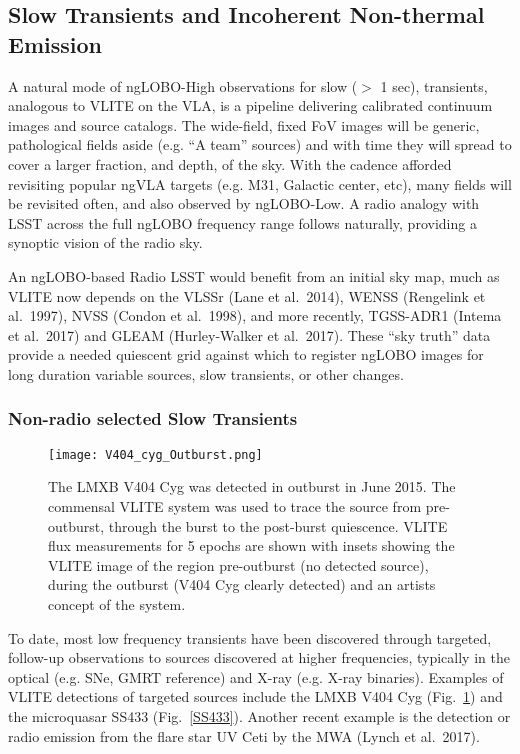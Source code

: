 \documentclass[11pt]{article}
\begin{document}
\subsection{Slow Transients and Incoherent Non-thermal Emission}

A natural mode of ngLOBO-High observations for slow ($>$ 1 sec),  transients, analogous to VLITE on the VLA, is a pipeline delivering calibrated continuum images and source catalogs. The wide-field, fixed FoV images will be generic, pathological fields aside (e.g. “A team” sources) and with time they will spread to cover a larger fraction, and depth, of the sky. With the cadence afforded revisiting popular ngVLA targets (e.g. M31, Galactic center, etc), many fields will be revisited often, and also observed by ngLOBO-Low. A radio analogy with LSST across the full ngLOBO frequency range follows naturally, providing a synoptic vision of the radio sky. 

An ngLOBO-based Radio LSST would benefit from an initial sky map, much as VLITE now depends on the VLSSr (Lane et al.\ 2014), WENSS (Rengelink et al.\ 1997), NVSS (Condon et al.\ 1998), and more recently, TGSS-ADR1 (Intema et al.\ 2017) and GLEAM (Hurley-Walker et al.\ 2017). These ``sky truth'' data provide a needed quiescent grid against which to register ngLOBO images for long duration variable sources, slow transients, or other changes.  

\subsubsection{Non-radio selected Slow Transients}

\begin{figure}[h!]
\begin{center}
\texttt{[image: V404\_cyg\_Outburst.png]}
\end{center}
\vspace{-0.5cm}
  \caption{
The LMXB V404 Cyg was detected in outburst in June 2015. The commensal VLITE system was used to trace the source from pre-outburst, through the burst to the post-burst quiescence. VLITE flux measurements for 5 epochs are shown with insets showing the VLITE image of the region pre-outburst (no detected source), during the outburst (V404 Cyg clearly detected) and an artists concept of the system.
}
\label{V404Cyg}
\end{figure}

To date, most low frequency transients have been discovered through targeted, follow-up observations to sources discovered at higher frequencies, typically in the optical (e.g. SNe, GMRT reference) and X-ray (e.g. X-ray binaries). Examples of VLITE detections of targeted sources include the LMXB V404 Cyg (Fig.~\ref{V404Cyg}) and the microquasar SS433 (Fig.~\ref{SS433}). Another recent example is the detection or radio emission from the flare star UV Ceti by the MWA (Lynch et al.\ 2017). 
\end{document}
